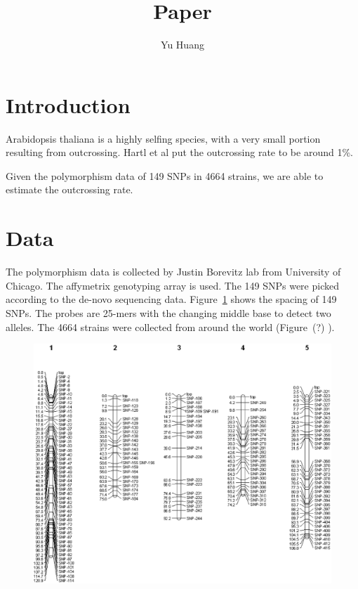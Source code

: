 \documentclass[a4paper,10pt]{article}
\title{Paper}
\author{Yu Huang}
\begin{document}
\maketitle

\begin{abstract}

\end{abstract}

\section{Introduction}
Arabidopsis thaliana is a highly selfing species, with a very small portion resulting from outcrossing. Hartl et al\cite{Hartl2007} put the outcrossing rate to be around 1\%.

Given the polymorphism data of 149 SNPs in 4664 strains, we are able to estimate the outcrossing rate.

\section{Data}
The polymorphism data is collected by Justin Borevitz lab from University of Chicago. The affymetrix genotyping array is used. The 149 SNPs were picked according to the de-novo sequencing data\cite{Nordborg2005}. Figure~\ref{f1} shows the spacing of 149 SNPs. The probes are 25-mers with the changing middle base to detect two alleles. The 4664 strains were collected from around the world (Figure~(?) ).

\begin{figure}
\includegraphics[width=1\textwidth]{figures/snp_locations_on_chr.eps}
\caption{}\label{f1}
\end{figure}
\end{document}
